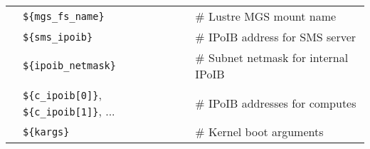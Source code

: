 \vspace*{0.2cm}
\vspace*{0.1cm}

\begin{tabular}{@{}>{\textbullet}l p{5.5cm} l}
& \texttt{\$\{mgs\_fs\_name\}} & {\small \# Lustre MGS mount name} \\
& \texttt{\$\{sms\_ipoib\}} & {\small \# IPoIB address for SMS server} \\
& \texttt{\$\{ipoib\_netmask\}} & {\small \# Subnet netmask for internal IPoIB} \\
& \texttt{\$\{c\_ipoib[0]\}}, \texttt{\$\{c\_ipoib[1]\}}, ... & {\small \# IPoIB addresses for computes} \\
& \texttt{\$\{kargs\}} & {\small \# Kernel boot arguments} \\  
\end{tabular}


